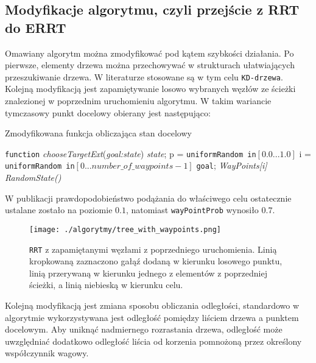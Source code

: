 \subsection{Modyfikacje algorytmu, czyli przejście z RRT do ERRT \label{sec:RRT:extend} }
Omawiany algorytm można zmodyfikować pod kątem szybkości działania. Po pierwsze, elementy drzewa można przechowywać w strukturach ułatwiających przeszukiwanie drzewa.
W literaturze stosowane są w tym celu \texttt{KD-drzewa}. Kolejną modyfikacją jest zapamiętywanie losowo wybranych węzłów ze ścieżki znalezionej w poprzednim uruchomieniu
algorytmu. W takim wariancie tymczasowy punkt docelowy obierany jest następująco:
 \begin{algorithm}[H]
	\caption{ Zmodyfikowana funkcja obliczająca stan docelowy }
	\label{alg:chooseTargetExt}
	\begin{algorithmic}
	\STATE \texttt{function} \textit{chooseTargetExt}(\textit{goal:state}) \textit{state};
	\STATE p = \texttt{uniformRandom in}$[0.0 ...1.0]$
	\STATE i = \texttt{uniformRandom in}$[0 ...number\_of\_waypoints -1]$
	  \RETURN  \texttt{goal};
	  \RETURN \textit{WayPoints[i]}
	  \RETURN \textit{RandomState()}
	\ENDIF
	\end{algorithmic}
  \end{algorithm}
W publikacji \cite{RRT} prawdopodobieństwo podążania do właściwego celu ostatecznie ustalane zostało na poziomie $0.1$, natomiast \texttt{wayPointProb} wynosiło $0.7$.
\begin{figure}[h]
\centering
\texttt{[image: ./algorytmy/tree\_with\_waypoints.png]}
\caption{ \texttt{RRT} z zapamiętanymi węzłami z poprzedniego uruchomienia. Linią kropkowaną zaznaczono gałąź dodaną w kierunku losowego punktu,
 linią przerywaną w kierunku jednego z elementów z poprzedniej ścieżki, a linią niebieską w kierunku celu.} \label{fig:tree_with_waypoints}
\end{figure} 
Kolejną modyfikacją jest zmiana sposobu obliczania odległości, standardowo w algorytmie wykorzystywana jest odległość pomiędzy liściem drzewa a punktem docelowym. Aby uniknąć
nadmiernego rozrastania drzewa, odległość może uwzględniać dodatkowo odległość liścia od korzenia pomnożoną przez określony współczynnik wagowy.

